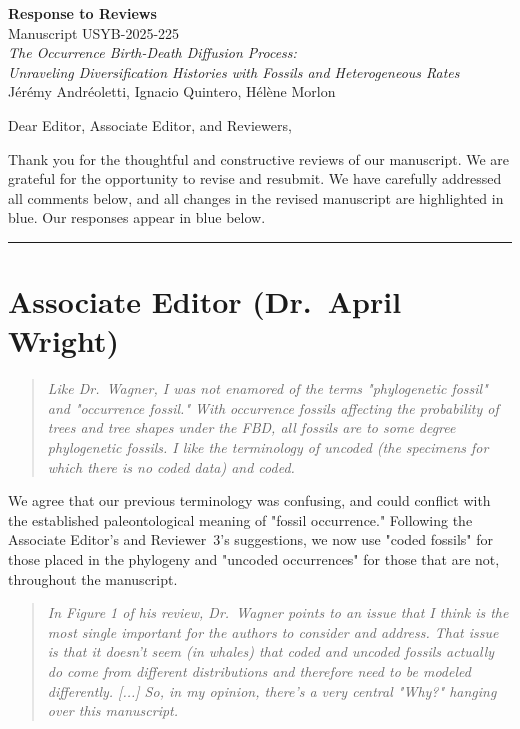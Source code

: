\documentclass[11pt]{article}
\newenvironment{RC}{\begin{quote}\itshape}{\end{quote}}
\newcommand{\response}[1]{\noindent\textcolor{resp}{#1}\medskip}
\begin{document}
\begin{center}
{\LARGE \textbf{Response to Reviews}}\\[8pt]
{\large Manuscript USYB-2025-225}\\[4pt]
{\large \textit{The Occurrence Birth-Death Diffusion Process:\\Unraveling Diversification Histories with Fossils and Heterogeneous Rates}}\\[8pt]
J\'er\'emy Andr\'eoletti, Ignacio Quintero, H\'el\`ene Morlon\\[12pt]
\end{center}

Dear Editor, Associate Editor, and Reviewers,

Thank you for the thoughtful and constructive reviews of our manuscript. We are grateful for the opportunity to revise and resubmit. We have carefully addressed all comments below, and all changes in the revised manuscript are highlighted in blue. Our responses appear in \textcolor{resp}{blue} below.

\bigskip\noindent\rule{\linewidth}{0.8pt}\bigskip

\section*{Associate Editor (Dr.\ April Wright)}

\begin{RC}
Like Dr.\ Wagner, I was not enamored of the terms "phylogenetic fossil" and "occurrence fossil." With occurrence fossils affecting the probability of trees and tree shapes under the FBD, all fossils are to some degree phylogenetic fossils. I like the terminology of uncoded (the specimens for which there is no coded data) and coded.
\end{RC}

\response{We agree that our previous terminology was confusing, and could conflict with the established paleontological meaning of "fossil occurrence." Following the Associate Editor's and Reviewer~3's suggestions, we now use "coded fossils" for those placed in the phylogeny and "uncoded occurrences" for those that are not, throughout the manuscript.}

\begin{RC}
In Figure 1 of his review, Dr.\ Wagner points to an issue that I think is the most single important for the authors to consider and address. That issue is that it doesn't seem (in whales) that coded and uncoded fossils actually do come from different distributions and therefore need to be modeled differently. [...] So, in my opinion, there's a very central "Why?" hanging over this manuscript.
\end{RC}
\end{document}
